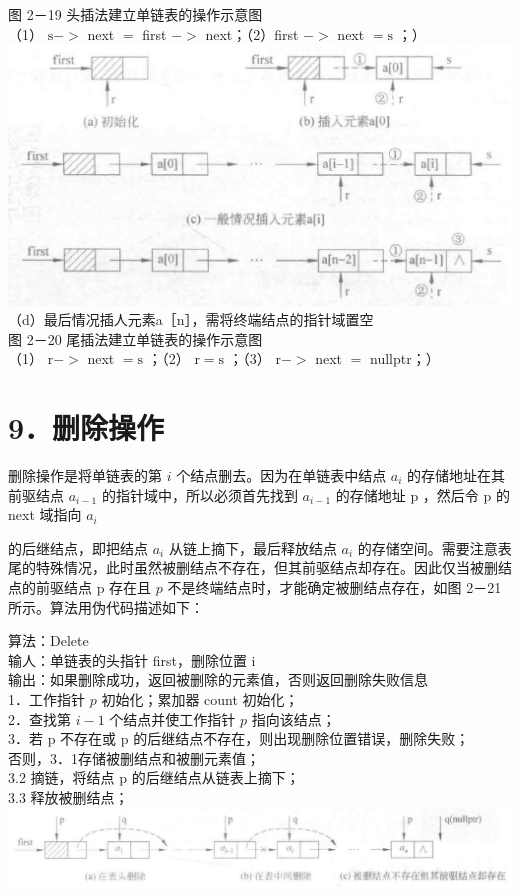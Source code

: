 \documentclass[10pt]{article}
\begin{document}
图 2－19 头插法建立单链表的操作示意图\\
（1） $\mathrm{s}->$ next $=$ first $->$ next；（2）first $->$ next $=\mathrm{s}$ ；）\\
\includegraphics[max width=\textwidth, center]{2025_06_06_704745ea57b15b2333e5g-059}\\
（d）最后情况插人元素a［n］，需将终端结点的指针域置空\\
图 2－20 尾插法建立单链表的操作示意图\\
（1） $\mathrm{r}->$ next $=\mathrm{s}$ ；（2） $\mathrm{r}=\mathrm{s}$ ；（3） $\mathrm{r}->$ next $=$ nullptr；）

\section*{9．删除操作}
删除操作是将单链表的第 $i$ 个结点删去。因为在单链表中结点 $a_{i}$ 的存储地址在其前驱结点 $a_{i-1}$ 的指针域中，所以必须首先找到 $a_{i-1}$ 的存储地址 p ，然后令 p 的 next 域指向 $a_{i}$

的后继结点，即把结点 $a_{i}$ 从链上摘下，最后释放结点 $a_{i}$ 的存储空间。需要注意表尾的特殊情况，此时虽然被删结点不存在，但其前驱结点却存在。因此仅当被删结点的前驱结点 p 存在且 $p$ 不是终端结点时，才能确定被删结点存在，如图 2－21 所示。算法用伪代码描述如下：

算法：Delete\\
输人：单链表的头指针 first，删除位置 i\\
输出：如果删除成功，返回被删除的元素值，否则返回删除失败信息\\
1．工作指针 $p$ 初始化；累加器 count 初始化；\\
2．查找第 $i-1$ 个结点并使工作指针 $p$ 指向该结点；\\
3．若 p 不存在或 p 的后继结点不存在，则出现删除位置错误，删除失败；\\
否则，3．1存储被删结点和被删元素值；\\
3.2 摘链，将结点 p 的后继结点从链表上摘下；\\
3.3 释放被删结点；\\
\includegraphics[max width=\textwidth, center]{2025_06_06_704745ea57b15b2333e5g-060}
\end{document}
